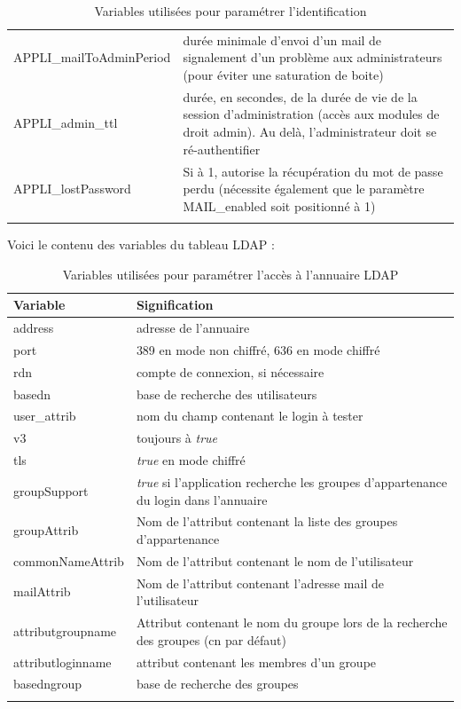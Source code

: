 \begin{longtable}{|p{5cm}|p{8cm}|}
APPLI\_mailToAdminPeriod & durée minimale d'envoi d'un mail de signalement d'un problème aux administrateurs (pour éviter une saturation de boite) \\

APPLI\_admin\_ttl & durée, en secondes, de la durée de vie de la session d'administration (accès aux modules de droit admin). Au delà, l'administrateur doit se ré-authentifier \\

APPLI\_lostPassword & Si à 1, autorise la récupération du mot de passe perdu (nécessite également que le paramètre MAIL\_enabled soit positionné à 1) \\
\hline

\caption{Variables utilisées pour paramétrer l'identification}
\end{longtable}

Voici le contenu des variables du tableau LDAP : 
\begin{longtable}{|p{5cm}|p{8cm}|}
\hline
\textbf{Variable} & \textbf{Signification} \\
\hline
\endhead
address &  adresse de l'annuaire\\

port & 389 en mode non chiffré, 636 en mode chiffré\\

rdn & compte de connexion, si nécessaire \\

basedn & base de recherche des utilisateurs\\

user\_attrib & nom du champ contenant le login à tester\\

v3 & toujours à \textit{true}\\

tls & \textit{true} en mode chiffré\\

groupSupport & \textit{true} si l'application recherche les groupes d'appartenance du login dans l'annuaire\\

groupAttrib & Nom de l'attribut contenant la liste des groupes d'appartenance\\

commonNameAttrib & Nom de l'attribut contenant le nom de l'utilisateur\\
\hline
mailAttrib & Nom de l'attribut contenant l'adresse mail de l'utilisateur\\

attributgroupname & Attribut contenant le nom du groupe lors de la recherche des groupes (cn par défaut)\\

attributloginname & attribut contenant les membres d'un groupe\\

basedngroup & base de recherche des groupes \\
\hline
\caption{Variables utilisées pour paramétrer l'accès à l'annuaire LDAP}
\end{longtable}

